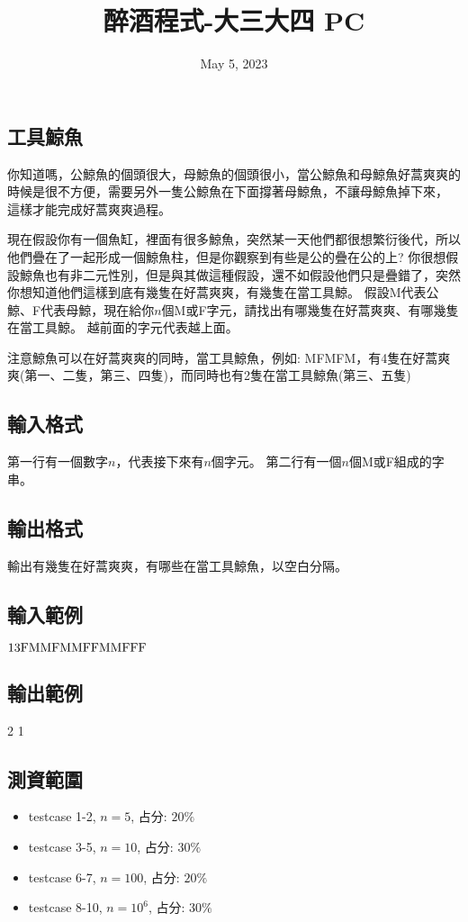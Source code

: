 \documentclass{article}
\title{醉酒程式-大三大四 PC}
\date{May 5, 2023}
\begin{document}
\begin{CJK*}{UTF8}{bsmi}

\maketitle

\section*{工具鯨魚}

你知道嗎，公鯨魚的個頭很大，母鯨魚的個頭很小，當公鯨魚和母鯨魚好蒿爽爽的時候是很不方便，需要另外一隻公鯨魚在下面撐著母鯨魚，不讓母鯨魚掉下來，
這樣才能完成好蒿爽爽過程。

現在假設你有一個魚缸，裡面有很多鯨魚，突然某一天他們都很想繁衍後代，所以他們疊在了一起形成一個鯨魚柱，但是你觀察到有些是公的疊在公的上?
你很想假設鯨魚也有非二元性別，但是與其做這種假設，還不如假設他們只是疊錯了，突然你想知道他們這樣到底有幾隻在好蒿爽爽，有幾隻在當工具鯨。
假設M代表公鯨、F代表母鯨，現在給你$n$個M或F字元，請找出有哪幾隻在好蒿爽爽、有哪幾隻在當工具鯨。
越前面的字元代表越上面。

注意鯨魚可以在好蒿爽爽的同時，當工具鯨魚，例如: MFMFM，有4隻在好蒿爽爽(第一、二隻，第三、四隻)，而同時也有2隻在當工具鯨魚(第三、五隻)

\subsection*{輸入格式}
第一行有一個數字$n$，代表接下來有$n$個字元。
第二行有一個$n$個M或F組成的字串。

\subsection*{輸出格式}
輸出有幾隻在好蒿爽爽，有哪些在當工具鯨魚，以空白分隔。

\subsection*{輸入範例}
$13\\\text{FMMFMMFFMMFFF}$

\subsection*{輸出範例}
2 1

\subsection*{測資範圍}
\begin{itemize}
    \item testcase 1-2, $n=5$, 占分: $20\%$
    \item testcase 3-5, $n=10$, 占分: $30\%$
    \item testcase 6-7, $n=100$, 占分: $20\%$
    \item testcase 8-10, $n=10^6$, 占分: $30\%$
\end{itemize}

\end{CJK*}
\end{document}

